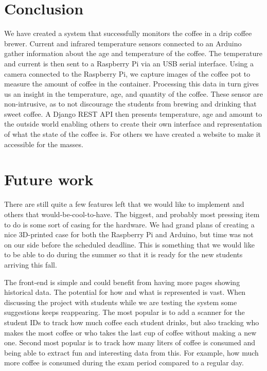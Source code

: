 \documentclass[12pt,a4paper,oneside,article]{memoir}
\numberwithin{equation}{chapter}
\begin{document}
\section{Conclusion}\label{sec:conclusion}
We have created a system that successfully monitors the coffee in a drip coffee
brewer. Current and infrared temperature sensors connected to an Arduino gather
information about the age and temperature of the coffee. The temperature and
current is then sent to a Raspberry Pi via an USB serial interface. Using a
camera connected to the Raspberry Pi, we capture images of the coffee pot to
measure the amount of coffee in the container. Processing this data in turn
gives us an insight in the temperature, age, and quantity of the coffee. These
sensor are non-intrusive, as to not discourage the students from brewing and
drinking that sweet coffee. A Django REST API then presents temperature, age and
amount to the outside world enabling others to create their own interface and
representation of what the state of the coffee is. For others we have created a
website to make it accessible for the masses.
 
\section{Future work}\label{sec:future-work}
There are still quite a few features left that we would like to implement and 
others that would-be-cool-to-have. The biggest, and probably most pressing 
item to do is some sort of casing for the hardware. We had grand plans of 
creating a nice 3D-printed case for both the Raspberry Pi and Arduino, but time 
was not on our side before the scheduled deadline. This is something that we 
would like to be able to do during the summer so that it is ready for the new 
students arriving this fall.

The front-end is simple and could benefit from having more pages showing
historical data. The potential for how and what is represented is vast. When 
discussing the project with students while we are testing the system some
suggestions keeps reappearing. The most popular is to add a scanner for 
the student IDs to track how much coffee each student drinks, but also tracking 
who makes the most coffee or who takes the last cup of coffee without making a 
new one. Second most popular is to track how many liters of coffee is 
consumed and being able to extract fun and interesting data from this. For 
example, how much more coffee is consumed during the exam period compared to a 
regular day.
\end{document}
